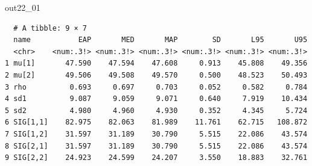 \begin{MCMCout}{}{out22_01}
	\begin{verbatim}
  # A tibble: 9 × 7
  name           EAP       MED       MAP        SD       L95       U95
  <chr>    <num:.3!> <num:.3!> <num:.3!> <num:.3!> <num:.3!> <num:.3!>
1 mu[1]       47.590    47.594    47.608     0.913    45.808    49.356
2 mu[2]       49.506    49.508    49.570     0.500    48.523    50.493
3 rho          0.693     0.697     0.703     0.052     0.582     0.784
4 sd1          9.087     9.059     9.071     0.640     7.919    10.434
5 sd2          4.980     4.960     4.930     0.352     4.345     5.724
6 SIG[1,1]    82.975    82.063    81.989    11.761    62.715   108.872
7 SIG[1,2]    31.597    31.189    30.790     5.515    22.086    43.574
8 SIG[2,1]    31.597    31.189    30.790     5.515    22.086    43.574
9 SIG[2,2]    24.923    24.599    24.207     3.550    18.883    32.761
\end{verbatim}
\end{MCMCout}
